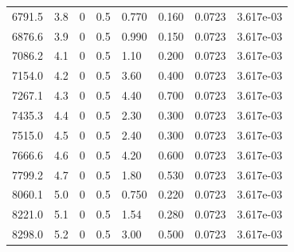 \documentclass[preview]{standalone}
\begin{document}
{{{\begin{tabular}{L{1.2cm}C{1.2cm} C{0.3cm}C{0.5cm} C{1.4cm}C{1.4cm} C{1.4cm}C{1.4cm}}
  6791.5  &   3.8  & 0     & 0.5 &  0.770  & 0.160  & 0.0723 &  3.617e-03   \\ 
  6876.6  &   3.9  & 0     & 0.5 &  0.990  & 0.150  & 0.0723 &  3.617e-03   \\ 
  7086.2  &   4.1  & 0     & 0.5 &  1.10  & 0.200  & 0.0723 &  3.617e-03   \\ 
  7154.0  &   4.2  & 0     & 0.5 &  3.60  & 0.400  & 0.0723 &  3.617e-03   \\ 
  7267.1  &   4.3  & 0     & 0.5 &  4.40  & 0.700  & 0.0723 &  3.617e-03   \\ 
  7435.3  &   4.4  & 0     & 0.5 &  2.30  & 0.300  & 0.0723 &  3.617e-03   \\ 
  7515.0  &   4.5  & 0     & 0.5 &  2.40  & 0.300  & 0.0723 &  3.617e-03   \\ 
  7666.6  &   4.6  & 0     & 0.5 &  4.20  & 0.600  & 0.0723 &  3.617e-03   \\ 
  7799.2  &   4.7  & 0     & 0.5 &  1.80  & 0.530  & 0.0723 &  3.617e-03   \\ 
  8060.1  &   5.0  & 0     & 0.5 &  0.750  & 0.220  & 0.0723 &  3.617e-03   \\ 
  8221.0  &   5.1  & 0     & 0.5 &  1.54  & 0.280  & 0.0723 &  3.617e-03   \\ 
  8298.0  &   5.2  & 0     & 0.5 &  3.00  & 0.500  & 0.0723 &  3.617e-03   \\ 
\hline 
\end{tabular} 

}}}
\end{document}
